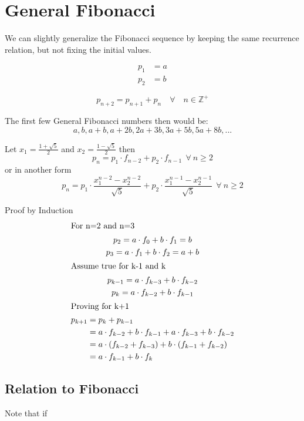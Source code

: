 \documentclass[a4paper]{article}
\begin{document}
\section{General Fibonacci}
We can slightly generalize the Fibonacci sequence by keeping the same recurrence relation, but not fixing the initial values. 

\begin{align}
p_1 &= a \\
p_2 &= b 
\end{align}

\begin{equation}
p_{n+2} = p_{n+1} + p_{n} \quad \forall \quad n \in \mathbb{Z}^+
\end{equation}

The first few General Fibonacci numbers then would be:
$$
a,b,a+b,a+2b,2a+3b,3a+5b,5a+8b, ...
$$

\begin{theorem}
Let 
$x_1 = \frac{1 + \sqrt{5}}{2}$ and 
$x_2 = \frac{1 - \sqrt{5}}{2}$ then 
$$
p_n = p_1 \cdot f_{n-2} + p_2 \cdot f_{n-1}  \ \ \forall \  n \geq 2 
$$
or in another form
$$
p_n = p_1 \cdot \frac{x_1^{n-2} - x_2^{n-2}}{\sqrt{5}} + p_2 \cdot \frac{x_1^{n-1} - x_2^{n-1}}{\sqrt{5}}  \ \ \forall \  n \geq 2 
$$

Proof by Induction
\begin{gather*}
\shortintertext{For n=2 and n=3}
p_2 = a \cdot f_0 + b \cdot f_1 = b \\
p_3 = a \cdot f_1 + b \cdot f_2 = a + b \\
\shortintertext{Assume true for k-1 and k}
p_{k-1} = a \cdot f_{k-3} + b \cdot f_{k-2}\\
p_k = a \cdot f_{k-2} + b \cdot f_{k-1}\\
\shortintertext{Proving for k+1}
\begin{split}
p_{k+1} &= p_k + p_{k-1}\\
		&= a \cdot f_{k-2} + b \cdot f_{k-1} + a \cdot f_{k-3} + b \cdot f_{k-2}\\
		&= a \cdot (f_{k-2}+f_{k-3}) + b \cdot (f_{k-1}+f_{k-2})\\
		&= a \cdot f_{k-1} + b \cdot f_{k}\\
\end{split}
\end{gather*}
\end{theorem}

\subsection{Relation to Fibonacci}
Note that if 
\end{document}

